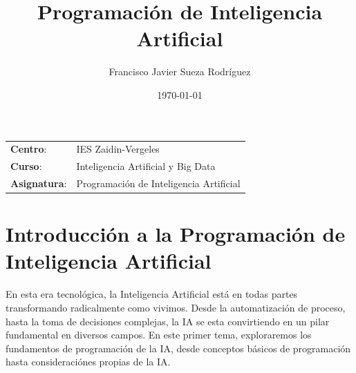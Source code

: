 


\title{
\vspace{10ex}
\normalfont \normalsize
\huge \textbf{Programación de Inteligencia Artificial}
}
\author{Francisco Javier Sueza Rodríguez}
\date{\normalsize\today}

\glsenablehyper
\makeglossaries
{}




\maketitle

\thispagestyle{empty}

\vspace{75ex}

\begin{center}
    \begin{tabular}{l l}
        \textbf{Centro}: & IES Zaidin-Vergeles \\
        \textbf{Curso}: & Inteligencia Artificial y Big Data\\
        \textbf{Asignatura}: & Programación de Inteligencia Artificial\\
    \end{tabular}
\end{center}

\newpage

\begingroup
\hypersetup{linkcolor=black}
\tableofcontents
\endgroup

\newpage

\begingroup
\hypersetup{linkcolor=black}
\listoffigures
\listoftables
\endgroup

\newpage

\section{Introducción a la Programación de Inteligencia Artificial}

En esta era tecnológica, la Inteligencia Artificial está en todas partes transformando radicalmente como vivimos. Desde la automatización de proceso, hasta la toma de decisiones complejas, la IA se esta convirtiendo en un pilar fundamental en diversos campos. En este primer tema, exploraremos los fundamentos de programación de la IA, desde conceptos básicos de programación hasta consideraciónes propias de la IA. 

